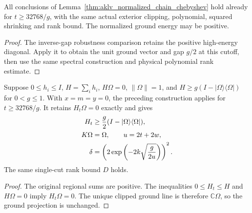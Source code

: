 \begin{lemma}
    \label{cor:aklv_inverse_gap_chebyshev}
    \leanok
    All conclusions of Lemma~\ref{thm:aklv_normalized_chain_chebyshev}
    hold already for $t\ge32768/g$, with the same actual exterior clipping,
    polynomial, squared shrinking and rank bound. The normalized ground
    energy may be positive.
\end{lemma}
\begin{proof}\leanok
    The inverse-gap robustness comparison retains the positive
    high-energy diagonal. Apply it to obtain the unit ground vector
    and gap $g/2$ at this cutoff, then use the same spectral
    construction and physical polynomial rank estimate.
\end{proof}

\begin{lemma}
    \label{cor:aklv_frustration_free_chebyshev}
    \leanok
    Suppose $0\le h_i\le I$, $H=\sum_i h_i$, $H\Omega=0$,
    $\|\Omega\|=1$, and
    $H\ge g(I-|\Omega\rangle\langle\Omega|)$ for $0<g\le1$.
    With $x=m=y=0$, the preceding construction applies for
    $t\ge32768/g$. It retains $H_t\Omega=0$ exactly and gives
    \begin{align}
        H_t     & \ge\frac g2(I-|\Omega\rangle\langle\Omega|),\notag              \\
        K\Omega & =\Omega,\qquad u=2t+2w,\notag                                   \\
        \delta  & =\left(2\exp\left(-2k\sqrt{\frac{g}{2u}}\right)\right)^2.\notag
    \end{align}
    The same single-cut rank bound $D$ holds.
\end{lemma}
\begin{proof}\leanok
    The original regional sums are positive.
    The inequalities $0\le H_t\le H$ and $H\Omega=0$ imply
    $H_t\Omega=0$. The unique clipped ground line is therefore
    $\mathbb C\Omega$, so the ground projection is unchanged.
\end{proof}

